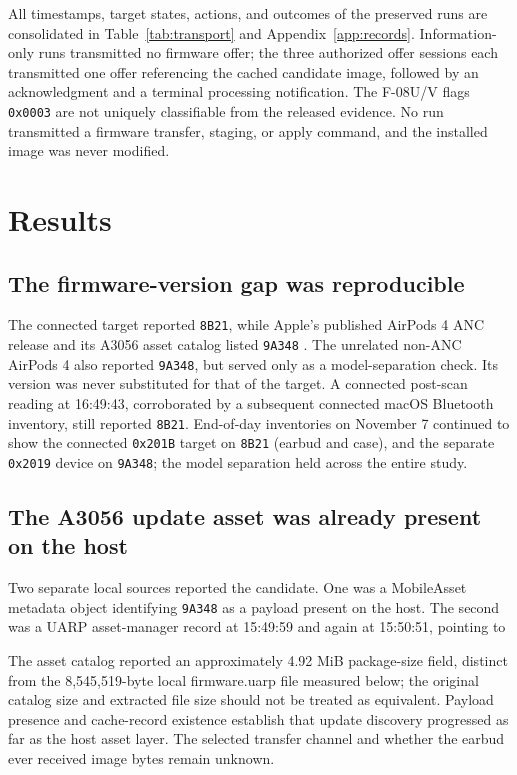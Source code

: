 \documentclass[11pt,letterpaper]{article}
\begin{document}
All timestamps, target states, actions, and outcomes of the preserved runs are consolidated in Table~\ref{tab:transport} and Appendix~\ref{app:records}. Information-only runs transmitted no firmware offer; the three authorized offer sessions each transmitted one offer referencing the cached candidate image, followed by an acknowledgment and a terminal processing notification. The F-08U/V flags \texttt{0x0003} are not uniquely classifiable from the released evidence. No run transmitted a firmware transfer, staging, or apply command, and the installed image was never modified.

\section{Results}\label{sec:results}
\subsection{The firmware-version gap was reproducible}
The connected target reported \texttt{8B21}, while Apple's published AirPods 4 ANC release and its A3056 asset catalog listed \texttt{9A348} \cite{applefw}. The unrelated non-ANC AirPods 4 also reported \texttt{9A348}, but served only as a model-separation check. Its version was never substituted for that of the target. A connected post-scan reading at 16:49:43, corroborated by a subsequent connected macOS Bluetooth inventory, still reported \texttt{8B21}. End-of-day inventories on November 7 continued to show the connected \texttt{0x201B} target on \texttt{8B21} (earbud and case), and the separate \texttt{0x2019} device on \texttt{9A348}; the model separation held across the entire study.

\subsection{The A3056 update asset was already present on the host}
Two separate local sources reported the candidate. One was a MobileAsset metadata object identifying \texttt{9A348} as a payload present on the host. The second was a UARP asset-manager record at 15:49:59 and again at 15:50:51, pointing to
\begin{center}\small\ttfamily{}\end{center}
The asset catalog reported an approximately 4.92 MiB package-size field, distinct from the 8,545,519-byte local firmware.uarp file measured below; the original catalog size and extracted file size should not be treated as equivalent. Payload presence and cache-record existence establish that update discovery progressed as far as the host asset layer. The selected transfer channel and whether the earbud ever received image bytes remain unknown.
\end{document}
